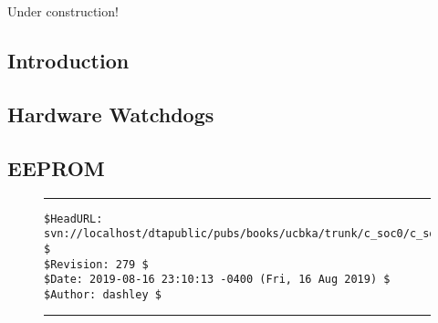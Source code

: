 
\chapter{\csoczerolongtitle{}}

\label{csoc0}

                     {Under construction!}

\section{Introduction}


\section{Hardware Watchdogs}


\section{EEPROM}



\vfill
\noindent\begin{figure}[!b]
\noindent\rule[-0.25in]{\textwidth}{1pt}
\begin{tiny}
\begin{verbatim}
$HeadURL: svn://localhost/dtapublic/pubs/books/ucbka/trunk/c_soc0/c_soc0.tex $
$Revision: 279 $
$Date: 2019-08-16 23:10:13 -0400 (Fri, 16 Aug 2019) $
$Author: dashley $
\end{verbatim}
\end{tiny}
\noindent\rule[0.25in]{\textwidth}{1pt}
\end{figure}
%
